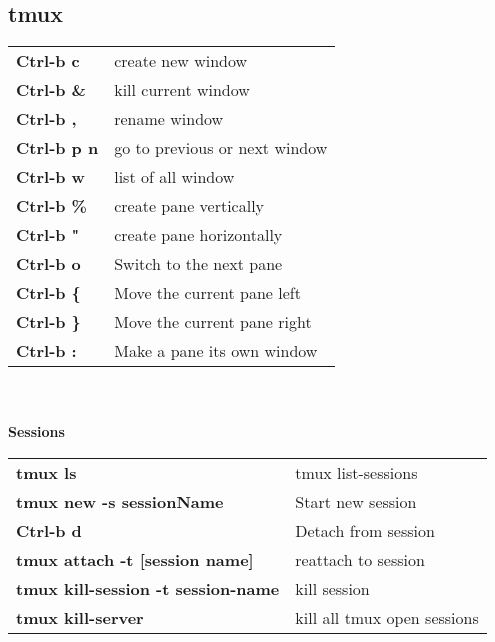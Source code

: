 \documentclass[10pt,landscape]{article}
\begin{document}
\begin{multicols}{3}
\vfill
\columnbreak

\section*{tmux}
\vspace{-0.7em}
\begin{tabular}{l l}
\textbf{Ctrl-b c} & create new window\\
\textbf{Ctrl-b \&} & kill current window\\
\textbf{Ctrl-b ,} & rename window\\
\textbf{Ctrl-b p n} & go to previous or next window\\
\textbf{Ctrl-b w} & list of all window\\
\textbf{Ctrl-b \%} & create pane vertically\\
\textbf{Ctrl-b "} & create pane horizontally\\
\textbf{Ctrl-b o} & Switch to the next pane\\
\textbf{Ctrl-b \{} & Move the current pane left\\
\textbf{Ctrl-b \}} & Move the current pane right\\
\textbf{Ctrl-b :} & Make a pane its own window\\
\end{tabular}
\\ \\
\textbf{Sessions}
\\
\begin{tabular}{l l}
\textbf{tmux ls} & tmux list-sessions\\
\textbf{tmux new -s sessionName} & Start new session\\
\textbf{Ctrl-b d} & Detach from session\\
\textbf{tmux attach -t [session name]} & reattach to session\\
\textbf{tmux kill-session -t session-name} & kill session\\
\textbf{tmux kill-server} & kill all tmux open sessions\\
\end{tabular}


\end{multicols}
\end{document}
